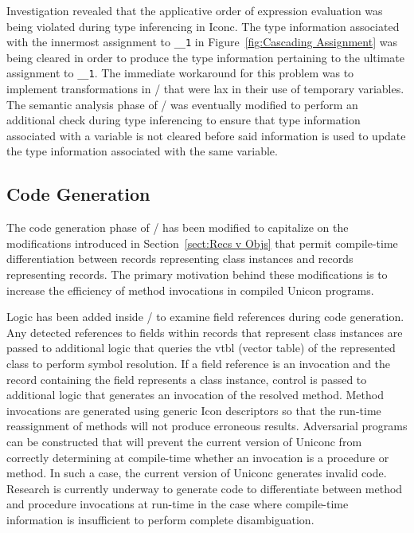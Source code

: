Investigation revealed that the applicative order of expression evaluation was
being violated during type inferencing in Iconc. The type information associated
with the innermost assignment to \texttt{\_\_1} in
Figure~\ref{fig:Cascading Assignment} was being cleared in order to produce the
type information pertaining to the ultimate assignment to \texttt{\_\_1}. The
immediate workaround for this problem was to implement transformations in \Ut/
that were lax in their use of temporary variables. The semantic analysis phase
of \Ic/ was eventually modified to perform an additional check during type
inferencing to ensure that type information associated with a variable is not
cleared before said information is used to update the type information
associated with the same variable.

\subsection{Code Generation}

The code generation phase of \Ic/ has been modified to capitalize on
the modifications introduced in Section~\ref{sect:Recs v Objs} that
permit \mbox{compile-time} differentiation between records
representing class instances and records representing records. The
primary motivation behind these modifications is to increase the
efficiency of method invocations in compiled Unicon programs.

Logic has been added inside \Ic/ to examine field references during
code generation. Any detected references to fields within records that
represent class instances are passed to additional logic that queries
the vtbl (vector table) of the represented class to perform symbol
resolution. If a field reference is an invocation and the record
containing the field represents a class instance, control is passed to
additional logic that generates an invocation of the resolved
method. Method invocations are generated using generic Icon
descriptors so that the \mbox{run-time} reassignment of methods will
not produce erroneous results. Adversarial programs can be constructed
that will prevent the current version of Uniconc from correctly
determining at \mbox{compile-time} whether an invocation is a
procedure or method. In such a case, the current version of Uniconc
generates invalid code. Research is currently underway to generate
code to differentiate between method and procedure invocations at
\mbox{run-time} in the case where \mbox{compile-time} information is
insufficient to perform complete disambiguation.

